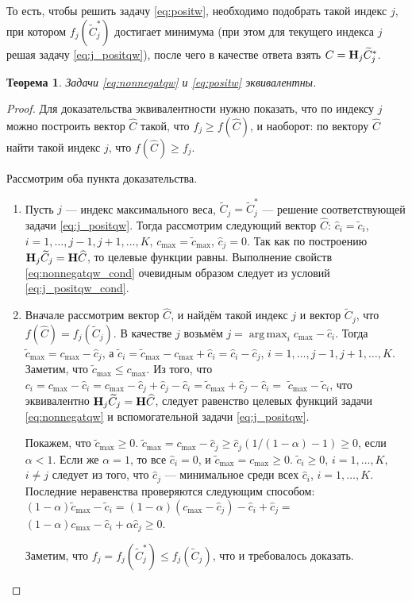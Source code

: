 \documentclass[12pt,a4paper]{article}
\DeclareMathOperator*{\argmax}{arg\,max}
\newtheorem{theorem}{Теорема}
\begin{document}
То есть, чтобы решить задачу \ref{eq:positw}, необходимо подобрать такой индекс $j$, при котором $f_j(\widetilde C_j^*)$ достигает минимума (при этом для текущего индекса $j$ решая задачу \eqref{eq:j_positqw}), после чего в качестве ответа взять $C = \mathbf{H}_j \widetilde C_j^*$.
\begin{theorem} \label{th:eqivqw}
	Задачи \eqref{eq:nonnegatqw} и \eqref{eq:positw} эквивалентны.
\end{theorem}
\begin{proof}
	Для доказательства эквивалентности нужно показать, что по индексу $j$ можно построить вектор $\widehat C$ такой, что $f_j \ge f(\widehat C)$, и наоборот: по вектору $\widehat C$ найти такой индекс $j$, что $f(\widehat C) \ge f_j$.
	
	Рассмотрим оба пункта доказательства.
	\begin{enumerate}
		\item Пусть $j$ --- индекс максимального веса, $\widetilde C_j = \widetilde C_j^*$ --- решение соответствующей задачи \eqref{eq:j_positqw}. Тогда рассмотрим следующий вектор $\widehat C$: $\hat c_i = \tilde c_i$, $i = 1, \ldots, j-1, j+1, \ldots, K$, $c_\text{max} = \tilde c_\text{max}$, $\hat c_j = 0$. Так как по построению $\mathbf{H}_j \widetilde C_j = \mathbf{H} \widehat C$, то целевые функции равны. Выполнение свойств \eqref{eq:nonnegatqw_cond} очевидным образом следует из условий \eqref{eq:j_positqw_cond}.
		\item Вначале рассмотрим вектор $\widehat C$, и найдём такой индекс $j$ и вектор $\widetilde C_j$, что $f(\widehat C) = f_j(\widetilde C_j)$. В качестве $j$ возьмём $j = \argmax_i c_\text{max} - \hat c_i$. Тогда $\tilde c_\text{max} = c_\text{max} - \hat c_j$, а $\tilde c_i = \tilde c_\text{max} - c_\text{max} + \hat c_i = \hat c_i - \hat c_j$, $i = 1, \ldots, j-1, j+1, \ldots, K$. Заметим, что $\tilde c_\text{max} \le c_\text{max}$. Из того, что $c_i = c_\text{max} - \hat c_i = c_\text{max} - \hat c_j + \hat c_j - \hat c_i = \tilde c_\text{max} + \hat c_j - \hat c_i =$ $\tilde c_\text{max} - \tilde c_i$, что эквивалентно $\mathbf{H}_j \widetilde C_j = \mathbf{H} \widehat C$, следует равенство целевых функций задачи \eqref{eq:nonnegatqw} и вспомогательной задачи \eqref{eq:j_positqw}.
		
		Покажем, что $\tilde c_\text{max} \ge 0$. $\tilde c_\text{max} = c_\text{max} - \hat c_j \ge \hat c_j (1/(1 - \alpha) - 1) \ge 0$, если $\alpha < 1$. Если же $\alpha = 1$, то все $\hat c_i = 0$, и $\tilde c_\text{max} = c_\text{max} \ge 0$. $\tilde c_i \ge 0$, $i = 1, \ldots, K$, $i \neq j$ следует из того, что $\hat c_j$ --- минимальное среди всех $\hat c_i$, $i = 1, \ldots, K$. Последние неравенства проверяются следующим способом: $(1 - \alpha) \tilde c_\text{max} - \tilde c_i = (1 - \alpha)(c_\text{max} - \hat c_j) - \hat c_i + \hat c_j = $ $(1 - \alpha)c_\text{max} - \hat c_i + \alpha \hat c_j \ge 0$.
		
		Заметим, что $f_j = f_j(\widetilde C_j^*) \le f_j(\widetilde C_j)$, что и требовалось доказать.
	\end{enumerate}
\end{proof}
\end{document}
